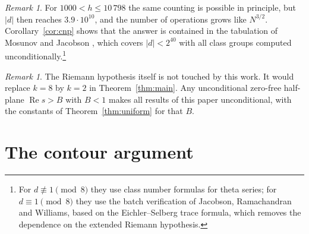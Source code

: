 \documentclass[11pt]{amsart}
\theoremstyle{definition}
\theoremstyle{remark}
\newtheorem{remark}[theorem]{Remark}
\renewcommand{\Re}{\operatorname{Re}}
\begin{document}
\begin{remark}
For $1000<h\le10\,798$ the same counting is possible in principle, but $|d|$ then reaches $3.9\cdot10^{10}$, and the number of operations grows like $N^{3/2}$. Corollary~\ref{cor:cnp} shows that the answer is contained in the tabulation of Mosunov and Jacobson \cite{MJ16}, which covers $|d|<2^{40}$ with all class groups computed unconditionally.\footnote{For $d\not\equiv1\pmod8$ they use class number formulas for theta series; for $d\equiv1\pmod 8$ they use the batch verification of Jacobson, Ramachandran and Williams, based on the Eichler--Selberg trace formula, which removes the dependence on the extended Riemann hypothesis.}
\end{remark}

\begin{remark}
The Riemann hypothesis itself is not touched by this work. It would replace $k=8$ by $k=2$ in Theorem~\ref{thm:main}. Any unconditional zero-free half-plane $\Re s>B$ with $B<1$ makes all results of this paper unconditional, with the constants of Theorem~\ref{thm:uniform} for that $B$.
\end{remark}

\appendix

\section{The contour argument}\label{app:contour}
\end{document}
